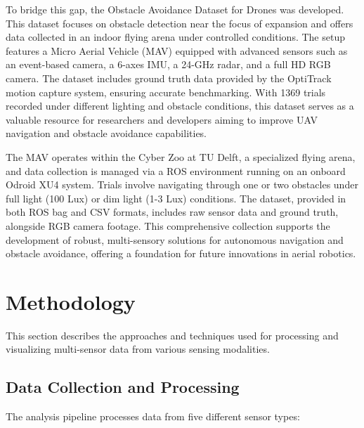 \documentclass[12pt,a4paper]{article}
\begin{document}
To bridge this gap, the Obstacle Avoidance Dataset for Drones was developed. This dataset focuses on obstacle detection near the focus of expansion and offers data collected in an indoor flying arena under controlled conditions. The setup features a Micro Aerial Vehicle (MAV) equipped with advanced sensors such as an event-based camera, a 6-axes IMU, a 24-GHz radar, and a full HD RGB camera. The dataset includes ground truth data provided by the OptiTrack motion capture system, ensuring accurate benchmarking. With 1369 trials recorded under different lighting and obstacle conditions, this dataset serves as a valuable resource for researchers and developers aiming to improve UAV navigation and obstacle avoidance capabilities.

The MAV operates within the Cyber Zoo at TU Delft, a specialized flying arena, and data collection is managed via a ROS environment running on an onboard Odroid XU4 system. Trials involve navigating through one or two obstacles under full light (100 Lux) or dim light (1-3 Lux) conditions. The dataset, provided in both ROS bag and CSV formats, includes raw sensor data and ground truth, alongside RGB camera footage. This comprehensive collection supports the development of robust, multi-sensory solutions for autonomous navigation and obstacle avoidance, offering a foundation for future innovations in aerial robotics.


\section{Methodology}

This section describes the approaches and techniques used for processing and visualizing multi-sensor data from various sensing modalities.

\subsection{Data Collection and Processing}

The analysis pipeline processes data from five different sensor types:
\end{document}
